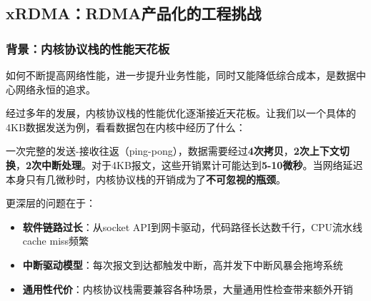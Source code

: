 \subsection{xRDMA：RDMA产品化的工程挑战}

\subsubsection{背景：内核协议栈的性能天花板}

如何不断提高网络性能，进一步提升业务性能，同时又能降低综合成本，是数据中心网络永恒的追求。

经过多年的发展，内核协议栈的性能优化逐渐接近天花板。让我们以一个具体的4KB数据发送为例，看看数据包在内核中经历了什么：


一次完整的发送-接收往返（ping-pong），数据需要经过\textbf{4次拷贝}，\textbf{2次上下文切换}，\textbf{2次中断处理}。对于4KB报文，这些开销累计可能达到\textbf{5-10微秒}。当网络延迟本身只有几微秒时，内核协议栈的开销成为了\textbf{不可忽视的瓶颈}。

更深层的问题在于：
\begin{itemize}
    \item \textbf{软件链路过长}：从socket API到网卡驱动，代码路径长达数千行，CPU流水线cache miss频繁
    \item \textbf{中断驱动模型}：每次报文到达都触发中断，高并发下中断风暴会拖垮系统
    \item \textbf{通用性代价}：内核协议栈需要兼容各种场景，大量通用性检查带来额外开销
\end{itemize}

